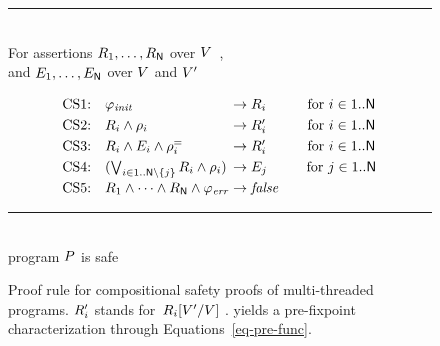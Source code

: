  \begin{figure}[t]
  \hrule
  \mbox{}\\
  For assertions $R_1, \dots, R_{\mathsf{N}}$ over $V$\ ,\\
  and $E_1, \dots, E_{\mathsf{N}}$ over $V$ and $V'$%

 \begin{equation*}
   \begin{array}[t]{c@{:\quad}l@{\;\rightarrow\;}l@{\qquad}c}
     \ruleInit & \SymbInit & \Reach_i & \text{for } i\in\ThreadIds\\[\jot]
     \ruleTransStep & \Reach_i \land \relTIdOf{i}
     &  \Reach_i' &  \text{for } i\in\ThreadIds\\[\jot]
     \ruleEnvStep & \Reach_i \land \Env_i \land \relLocEqOf{i} & \Reach_i' & \text{for } i\in\ThreadIds\\[\jot]
     \ruleTransEnv & (\Lor_{i\in\ThreadIds\setminus\set{j}} \Reach_i  \land \relTIdOf{i}) & \Env_j & \text{for } j\in\ThreadIds\\[\jot]
     \ruleCheck & \Reach_1  \land \dots \land \Reach_\Num \land
     \SymbError & \lfalse & 
   \end{array}
 \end{equation*}
 \centering
 \rule{.85\linewidth}{.5pt}\\
 program $P$ is safe
 \caption{Proof rule \ProofRule for compositional safety proofs
   of multi-threaded programs.
   $R_i'$ stands for~$R_i[V'/V]\ $.
   \ProofRule yields a pre-fixpoint characterization through
   Equations~\eqref{eq-pre-func}.
 }
  \label{fig-eq-abst-mod-reach}
\end{figure}
